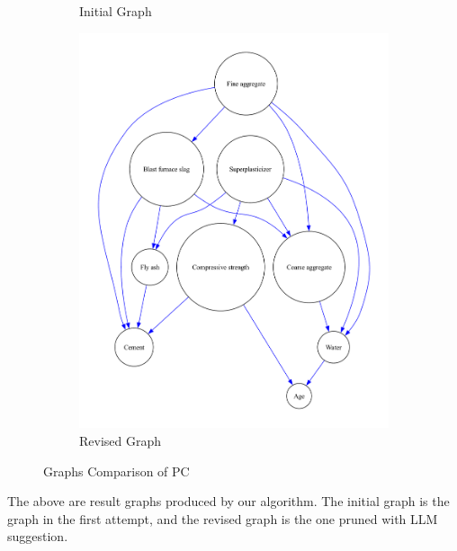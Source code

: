 \documentclass{article}
\begin{document}
\begin{figure}[H]
\begin{subfigure}{0.3\textwidth}
        \vfill
        \caption{Initial Graph}
        \label{fig:sub2}
    \end{subfigure}
    \hspace{0.04\textwidth}
    \begin{subfigure}{0.3\textwidth}
        \centering
        \vspace{-0.5cm}
        \includegraphics[width=\linewidth]{dataset/CCS_Data/output_graph/revised_graph.pdf}
        \vfill
        \caption{Revised Graph}
        \label{fig:sub3}
    \end{subfigure}
    \caption{Graphs Comparison of PC}
    \label{fig:main}
\end{figure}

The above are result graphs produced by our algorithm.
The initial graph is the graph in the first attempt, and the revised graph is the one pruned with LLM suggestion.
\end{document}
